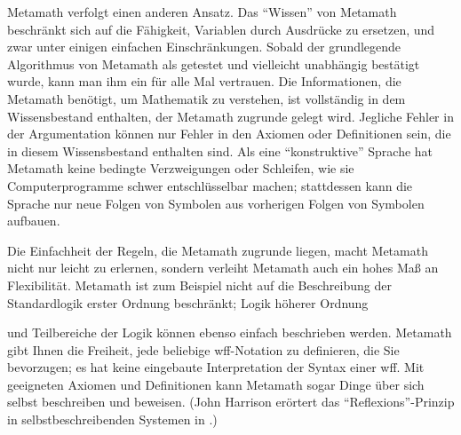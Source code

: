 {Metamath verfolgt einen anderen Ansatz.  Das "`Wissen"' von Metamath beschränkt sich auf die Fähigkeit, Variablen durch Ausdrücke zu ersetzen, und zwar unter einigen einfachen Einschränkungen.  Sobald der grundlegende Algorithmus von Metamath als getestet und vielleicht unabhängig bestätigt wurde, kann man ihm ein für alle Mal vertrauen.  Die Informationen, die Metamath benötigt, um Mathematik zu verstehen, ist vollständig in dem Wissensbestand enthalten, der Metamath zugrunde gelegt wird.  Jegliche Fehler in der Argumentation können nur Fehler in den Axiomen oder Definitionen sein, die in diesem Wissensbestand enthalten sind.
Als eine "`konstruktive"' Sprache hat Metamath keine bedingte Verzweigungen oder Schleifen, wie sie Computerprogramme schwer entschlüsselbar machen; stattdessen kann die Sprache nur neue Folgen von Symbolen aus vorherigen Folgen von Symbolen aufbauen.

Die Einfachheit der Regeln, die Metamath zugrunde liegen, macht Metamath nicht nur leicht zu erlernen, sondern verleiht Metamath auch ein hohes Maß an Flexibilität. Metamath ist zum Beispiel nicht auf die Beschreibung der Standardlogik erster Ordnung beschränkt; Logik höherer Ordnung} und Teilbereiche der Logik können ebenso einfach beschrieben werden.
Metamath gibt Ihnen die Freiheit, jede beliebige wff-Notation zu definieren, die Sie bevorzugen; es hat keine eingebaute Interpretation der Syntax einer wff. Mit geeigneten Axiomen und Definitionen kann Metamath sogar Dinge über sich selbst beschreiben und beweisen. (John Harrison erörtert das "`Reflexions"'-Prinzip in selbstbeschreibenden Systemen in \cite{Harrison}.)

